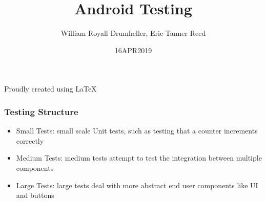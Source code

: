 \documentclass[10pt]{beamer}
\title{Android Testing}
\author{William Royall Drumheller, Eric Tanner Reed}
\date{16APR2019}
\begin{document}
\begin{frame}
\titlepage
\begin{center}
Proudly created using \LaTeX
\end{center}
\end{frame}

\begin{frame}
\frametitle{Testing Structure}
\begin{itemize}
    \item Small Tests: small scale Unit tests, such as testing that a counter increments correctly
    \item Medium Tests: medium tests attempt to test the integration between multiple components
    \item Large Tests: large tests deal with more abstract end user components like UI and buttons
\end{itemize}
\end{frame}






\end{document}
